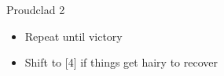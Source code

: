 \begin{battle}{Proudclad 2}
\begin{multicols}{2}
\begin{itemize}
\begin{itemize}
\begin{itemize}
                            \begin{itemize}
                              \item Repeat until victory
                              \item Shift to [4] if things get hairy to recover
                            \end{itemize}
                    \end{itemize}
            \end{itemize}
    \end{itemize}
  \end{multicols}
\end{battle}
